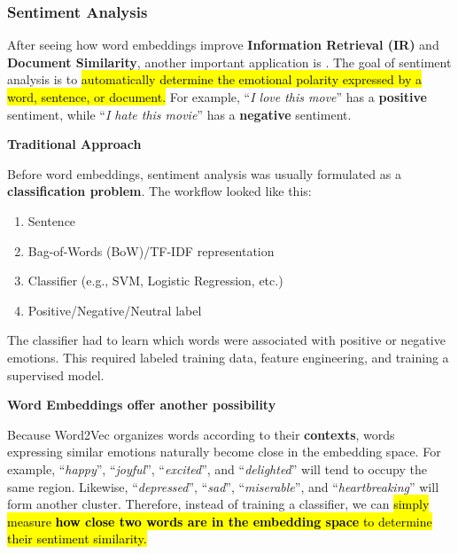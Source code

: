 \subsubsection{Sentiment Analysis}\label{sec:sentiment-analysis}

After seeing how word embeddings improve \textbf{Information Retrieval (IR)} and \textbf{Document Similarity}, another important application is . The goal of sentiment analysis is to \hl{automatically determine the emotional polarity expressed by a word, sentence, or document.} For example, ``\emph{I love this move}'' has a \textbf{positive} sentiment, while ``\emph{I hate this movie}'' has a \textbf{negative} sentiment.

\highspace
\begin{flushleft}
    \textcolor{Red2}{ \textbf{Traditional Approach}}
\end{flushleft}
Before word embeddings, sentiment analysis was usually formulated as a \textbf{classification problem}. The workflow looked like this:
\begin{enumerate}
    \item Sentence
    \item Bag-of-Words (BoW)/TF-IDF representation
    \item Classifier (e.g., SVM, Logistic Regression, etc.)
    \item Positive/Negative/Neutral label
\end{enumerate}
The classifier had to learn which words were associated with positive or negative emotions. This required labeled training data, feature engineering, and training a supervised model.

\highspace
\begin{flushleft}
    \textcolor{Green3}{ \textbf{Word Embeddings offer another possibility}}
\end{flushleft}
Because Word2Vec organizes words according to their \textbf{contexts}, words expressing similar emotions naturally become close in the embedding space. For example, ``\emph{happy}'', ``\emph{joyful}'', ``\emph{excited}'', and ``\emph{delighted}'' will tend to occupy the same region. Likewise, ``\emph{depressed}'', ``\emph{sad}'', ``\emph{miserable}'', and ``\emph{heartbreaking}'' will form another cluster. Therefore, instead of training a classifier, we can \hl{simply measure \textbf{how close two words are in the embedding space} to determine their sentiment similarity.}

